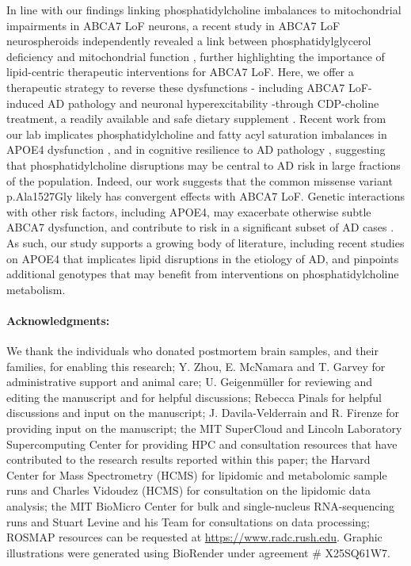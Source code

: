 \documentclass[12pt]{article}
\begin{document}
In line with our findings linking phosphatidylcholine imbalances to mitochondrial impairments in ABCA7 LoF neurons, a recent study in ABCA7 LoF neurospheroids independently revealed a link between phosphatidylglycerol deficiency and mitochondrial function \cite{Kawatani2023-vf}, further highlighting the importance of lipid-centric therapeutic interventions for ABCA7 LoF. Here, we offer a therapeutic strategy to reverse these dysfunctions - including ABCA7 LoF-induced AD pathology and neuronal hyperexcitability -through CDP-choline treatment, a readily available and safe dietary supplement \cite{Gavrilova2018-oi,Zeisel2009-xv,Blusztajn2017-nv}.  Recent work from our lab implicates phosphatidylcholine and fatty acyl saturation imbalances in APOE4 dysfunction \cite{Sienski2021-zt}, and in cognitive resilience to AD pathology \cite{Mathys2024-ex}, suggesting that phosphatidylcholine disruptions may be central to AD risk in large fractions of the population. Indeed, our work suggests that the common missense variant p.Ala1527Gly likely has convergent effects with ABCA7 LoF. Genetic interactions with other risk factors, including APOE4, may exacerbate otherwise subtle ABCA7 dysfunction, and contribute to risk in a significant subset of AD cases \cite{Wang2021-oa,Hemani2013-zr,Haig2011-vs,Zuk2012-uz}. As such, our study supports a growing body of literature, including recent studies on APOE4 \cite{Haney2024-fx,Victor2022-tl} that implicates lipid disruptions in the etiology of AD, and pinpoints additional genotypes that may benefit from interventions on phosphatidylcholine metabolism.




%
 \clearpage

\label{sec:acknowledgments}
\paragraph{Acknowledgments:} We thank the individuals who donated postmortem brain samples, and their families, for enabling this research; Y. Zhou, E. McNamara and T. Garvey for administrative support and animal care; U. Geigenmüller for reviewing and editing the manuscript and for helpful discussions; Rebecca Pinals for helpful discussions and input on the manuscript; J. Davila-Velderrain and R. Firenze for providing input on the manuscript; the MIT SuperCloud and Lincoln Laboratory Supercomputing Center for providing HPC and consultation resources that have contributed to the research results reported within this paper; the Harvard Center for Mass Spectrometry (HCMS) for lipidomic and metabolomic sample runs and Charles Vidoudez (HCMS) for consultation on the lipidomic data analysis; the MIT BioMicro Center for bulk and single-nucleus RNA-sequencing runs and Stuart Levine and his Team for consultations on data processing; ROSMAP resources can be requested at \url{https://www.radc.rush.edu}. Graphic illustrations were generated using BioRender under agreement \# X25SQ61W7.
\end{document}
